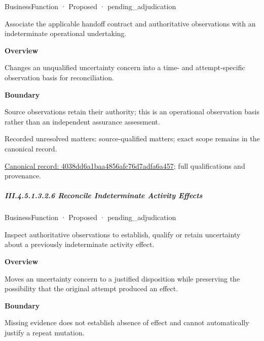 \label{element:4038dd6a1baa4856afc76d7adfa6a457}
{\small BusinessFunction · Proposed · pending\_adjudication}\par

Associate the applicable handoff contract and authoritative observations with an indeterminate operational undertaking.



\textbf{Overview}



Changes an unqualified uncertainty concern into a time- and attempt-specific observation basis for reconciliation.



\textbf{Boundary}



Source observations retain their authority; this is an operational observation basis rather than an independent assurance assessment.


{\small Recorded unresolved matters: source-qualified matters; exact scope remains in the canonical record.}\par
{\footnotesize \href{../../../../continuum/business/business-function/4038dd6a1baa4856afc76d7adfa6a457.md}{Canonical record: 4038dd6a1baa4856afc76d7adfa6a457}; full qualifications and provenance.}\par
\subparagraph*{III.4.5.1.3.2.6 Reconcile Indeterminate Activity Effects}
\label{navigation:III.4.5.1.3.2.6}

\label{element:eace49fe7b304ad786d460ccef622378}
{\small BusinessFunction · Proposed · pending\_adjudication}\par

Inspect authoritative observations to establish, qualify or retain uncertainty about a previously indeterminate activity effect.



\textbf{Overview}



Moves an uncertainty concern to a justified disposition while preserving the possibility that the original attempt produced an effect.



\textbf{Boundary}



Missing evidence does not establish absence of effect and cannot automatically justify a repeat mutation.


